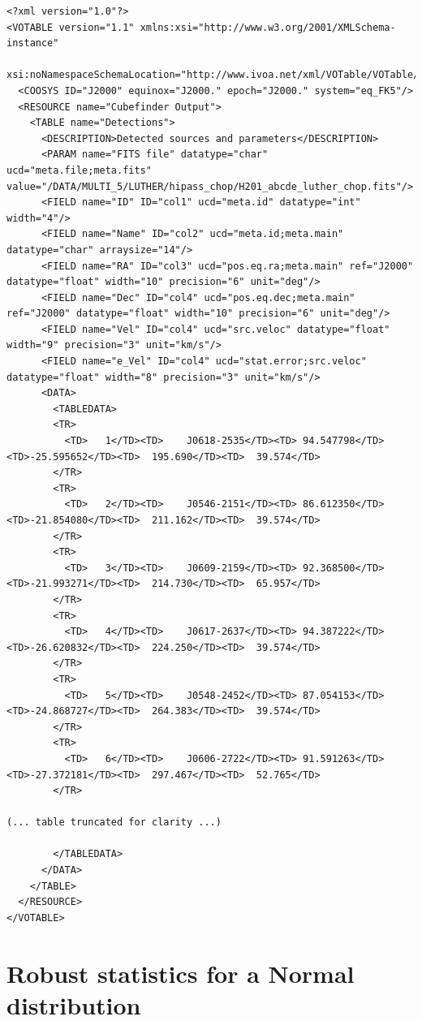 \documentclass[12pt]{article}
\begin{document}
\begin{landscape}
{\scriptsize
  \begin{verbatim}
<?xml version="1.0"?>
<VOTABLE version="1.1" xmlns:xsi="http://www.w3.org/2001/XMLSchema-instance"
 xsi:noNamespaceSchemaLocation="http://www.ivoa.net/xml/VOTable/VOTable/v1.1">
  <COOSYS ID="J2000" equinox="J2000." epoch="J2000." system="eq_FK5"/>
  <RESOURCE name="Cubefinder Output">
    <TABLE name="Detections">
      <DESCRIPTION>Detected sources and parameters</DESCRIPTION>
      <PARAM name="FITS file" datatype="char" ucd="meta.file;meta.fits" value="/DATA/MULTI_5/LUTHER/hipass_chop/H201_abcde_luther_chop.fits"/>
      <FIELD name="ID" ID="col1" ucd="meta.id" datatype="int" width="4"/>
      <FIELD name="Name" ID="col2" ucd="meta.id;meta.main" datatype="char" arraysize="14"/>
      <FIELD name="RA" ID="col3" ucd="pos.eq.ra;meta.main" ref="J2000" datatype="float" width="10" precision="6" unit="deg"/>
      <FIELD name="Dec" ID="col4" ucd="pos.eq.dec;meta.main" ref="J2000" datatype="float" width="10" precision="6" unit="deg"/>
      <FIELD name="Vel" ID="col4" ucd="src.veloc" datatype="float" width="9" precision="3" unit="km/s"/>
      <FIELD name="e_Vel" ID="col4" ucd="stat.error;src.veloc" datatype="float" width="8" precision="3" unit="km/s"/>
      <DATA>
        <TABLEDATA>
        <TR>
          <TD>   1</TD><TD>    J0618-2535</TD><TD> 94.547798</TD><TD>-25.595652</TD><TD>  195.690</TD><TD>  39.574</TD>
        </TR>
        <TR>
          <TD>   2</TD><TD>    J0546-2151</TD><TD> 86.612350</TD><TD>-21.854080</TD><TD>  211.162</TD><TD>  39.574</TD>
        </TR>
        <TR>
          <TD>   3</TD><TD>    J0609-2159</TD><TD> 92.368500</TD><TD>-21.993271</TD><TD>  214.730</TD><TD>  65.957</TD>
        </TR>
        <TR>
          <TD>   4</TD><TD>    J0617-2637</TD><TD> 94.387222</TD><TD>-26.620832</TD><TD>  224.250</TD><TD>  39.574</TD>
        </TR>
        <TR>
          <TD>   5</TD><TD>    J0548-2452</TD><TD> 87.054153</TD><TD>-24.868727</TD><TD>  264.383</TD><TD>  39.574</TD>
        </TR>
        <TR>
          <TD>   6</TD><TD>    J0606-2722</TD><TD> 91.591263</TD><TD>-27.372181</TD><TD>  297.467</TD><TD>  52.765</TD>
        </TR>

(... table truncated for clarity ...)

        </TABLEDATA>
      </DATA>
    </TABLE>
  </RESOURCE>
</VOTABLE>
  \end{verbatim}
}
\end{landscape}

\section{Robust statistics for a Normal distribution}
\label{app-madfm}
\end{document}
